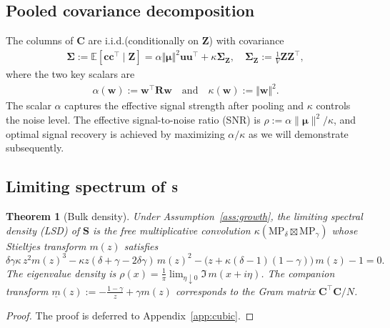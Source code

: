 \documentclass{article}
\def\vmu{{\bm{\mu}}}
\def\vc{{\bm{c}}}
\def\vu{{\bm{u}}}
\def\vw{{\bm{w}}}
\def\mC{{\bm{C}}}
\def\mR{{\bm{R}}}
\def\mS{{\bm{S}}}
\def\mZ{{\bm{Z}}}
\def\mSigma{{\bm{\Sigma}}}
\newcommand{\E}{\mathbb{E}}
\newtheorem{theorem}{Theorem}
\begin{document}
\subsection{Pooled covariance decomposition}\label{sec:cov_decomp}
The columns of $\mC$ are i.i.d.\@ (conditionally on $\mZ$) with covariance
\begin{align}\label{eq:Sigma}
    \mSigma := \E\left[ \vc \vc^\top \mid \mZ  \right] = \alpha \Vert \vmu \Vert^2 \vu \vu^\top + \kappa \mSigma_{\mZ}, \quad \mSigma_{\mZ}:= \frac{1}{V} \mZ \mZ^\top,
\end{align}
where the two key scalars are
\begin{align}\label{eq:alpha_kappa}
    \alpha(\vw):= \vw^\top \mR \vw \quad \text{and} \quad \kappa(\vw) := \Vert \vw \Vert^2.
\end{align}
The scalar $\alpha$ captures the effective signal strength after pooling and $\kappa$ controls the noise level. The effective signal-to-noise ratio (SNR) is $\rho := \alpha\|\vmu\|^2/\kappa$, and optimal signal recovery is achieved by maximizing $\alpha/\kappa$ as we will demonstrate subsequently.

\subsection{Limiting spectrum of $\bf S$}\label{sec:bulk}

\begin{theorem}[Bulk density]\label{thm:bulk}
    Under Assumption~\ref{ass:growth}, the limiting spectral density (LSD) of $\mS$ is the free multiplicative convolution $\kappa \left( \mathrm{MP}_\delta \boxtimes \mathrm{MP}_\gamma \right)$ whose Stieltjes transform $m(z)$ satisfies
    \begin{equation}\label{eq:cubic}
\delta\gamma \kappa\,z^2 m(z)^3
-\kappa z(\delta+\gamma-2\delta\gamma)\,m(z)^2
-\big(z+\kappa(\delta-1)(1-\gamma)\big)\,m(z)
-1
=0.
\end{equation}
The eigenvalue density is $\rho(x) = \frac{1}{\pi}\lim_{\eta\downarrow0}\Im\,m(x+i\eta)$. The companion transform $\underline{m}(z):=-\frac{1-\gamma}{z} + \gamma m(z)$ corresponds to the Gram matrix $\mC^\top \mC/N$.
\end{theorem}
\begin{proof}
The proof is deferred to Appendix~\ref{app:cubic}.
\end{proof}
\end{document}
